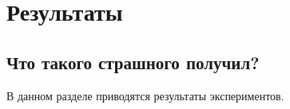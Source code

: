 \chapter{Результаты}
\label{cha:results}

\section{Что такого страшного получил?}

В данном разделе приводятся результаты экспериментов.


